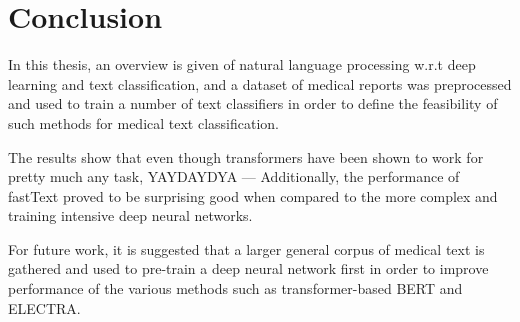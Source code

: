 \chapter{Conclusion} \label{Conclusion}
In this thesis, an overview is given of natural language processing w.r.t deep learning and text classification, and a dataset of medical reports was preprocessed and used to train a number of text classifiers in order to define the feasibility of such methods for medical text classification.

The results show that even though transformers have been shown to work for pretty much any task, YAYDAYDYA ---
Additionally, the performance of fastText proved to be surprising good when compared to the more complex and training intensive deep neural networks.

For future work, it is suggested that a larger general corpus of medical text is gathered and used to pre-train a deep neural network first in order to improve performance of the various methods such as transformer-based BERT and ELECTRA.
